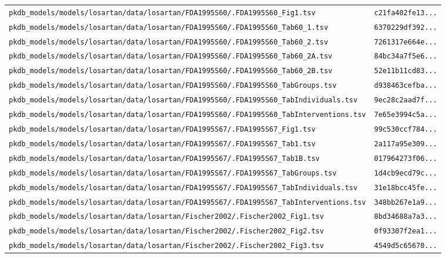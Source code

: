 \documentclass{article}
\begin{document}
\begin{longtable}{ll}
\texttt{pkdb\_models/models/losartan/data/losartan/FDA1995S60/.FDA1995S60\_Fig1.tsv} & \texttt{c21fa402fe13...} \\
\texttt{pkdb\_models/models/losartan/data/losartan/FDA1995S60/.FDA1995S60\_Tab60\_1.tsv} & \texttt{6370229df392...} \\
\texttt{pkdb\_models/models/losartan/data/losartan/FDA1995S60/.FDA1995S60\_Tab60\_2.tsv} & \texttt{7261317e664e...} \\
\texttt{pkdb\_models/models/losartan/data/losartan/FDA1995S60/.FDA1995S60\_Tab60\_2A.tsv} & \texttt{84bc34a7f5e6...} \\
\texttt{pkdb\_models/models/losartan/data/losartan/FDA1995S60/.FDA1995S60\_Tab60\_2B.tsv} & \texttt{52e11b11cd83...} \\
\texttt{pkdb\_models/models/losartan/data/losartan/FDA1995S60/.FDA1995S60\_TabGroups.tsv} & \texttt{d938463cefba...} \\
\texttt{pkdb\_models/models/losartan/data/losartan/FDA1995S60/.FDA1995S60\_TabIndividuals.tsv} & \texttt{9ec28c2aad7f...} \\
\texttt{pkdb\_models/models/losartan/data/losartan/FDA1995S60/.FDA1995S60\_TabInterventions.tsv} & \texttt{7e65e3994c5a...} \\
\texttt{pkdb\_models/models/losartan/data/losartan/FDA1995S67/.FDA1995S67\_Fig1.tsv} & \texttt{99c530ccf784...} \\
\texttt{pkdb\_models/models/losartan/data/losartan/FDA1995S67/.FDA1995S67\_Tab1.tsv} & \texttt{2a117a95e309...} \\
\texttt{pkdb\_models/models/losartan/data/losartan/FDA1995S67/.FDA1995S67\_Tab1B.tsv} & \texttt{017964273f06...} \\
\texttt{pkdb\_models/models/losartan/data/losartan/FDA1995S67/.FDA1995S67\_TabGroups.tsv} & \texttt{1d4cb9ecd79c...} \\
\texttt{pkdb\_models/models/losartan/data/losartan/FDA1995S67/.FDA1995S67\_TabIndividuals.tsv} & \texttt{31e18bcc45fe...} \\
\texttt{pkdb\_models/models/losartan/data/losartan/FDA1995S67/.FDA1995S67\_TabInterventions.tsv} & \texttt{348bb267e1a9...} \\
\texttt{pkdb\_models/models/losartan/data/losartan/Fischer2002/.Fischer2002\_Fig1.tsv} & \texttt{8bd34688a7a3...} \\
\texttt{pkdb\_models/models/losartan/data/losartan/Fischer2002/.Fischer2002\_Fig2.tsv} & \texttt{0f93307f2ea1...} \\
\texttt{pkdb\_models/models/losartan/data/losartan/Fischer2002/.Fischer2002\_Fig3.tsv} & \texttt{4549d5c65670...} \\

\end{longtable}
\end{document}
